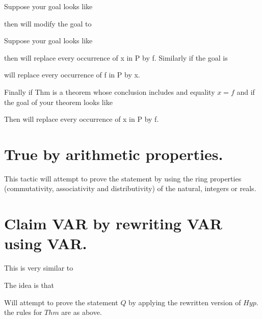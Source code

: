 Suppose your goal looks like

then 
will modify the goal to




Suppose your goal looks like

then 
will replace every occurrence of x in P by f. Similarly if the goal is 


will replace every occurrence of f in P by x.  

Finally if Thm is a theorem whose conclusion includes and equality $x=f$ and if the goal of your theorem looks like

 Then 
will replace every occurrence of x in P by f.  



\section{True by arithmetic properties.}

This tactic will attempt to prove the statement by using the ring properties (commutativity, associativity and distributivity) of the natural, integers or reals. 

\section{Claim VAR by rewriting VAR using VAR.}

This is very similar to 

The idea is that 

Will attempt to prove the statement $Q$ by applying the rewritten version of $Hyp$. the rules for $Thm$ are as above.

